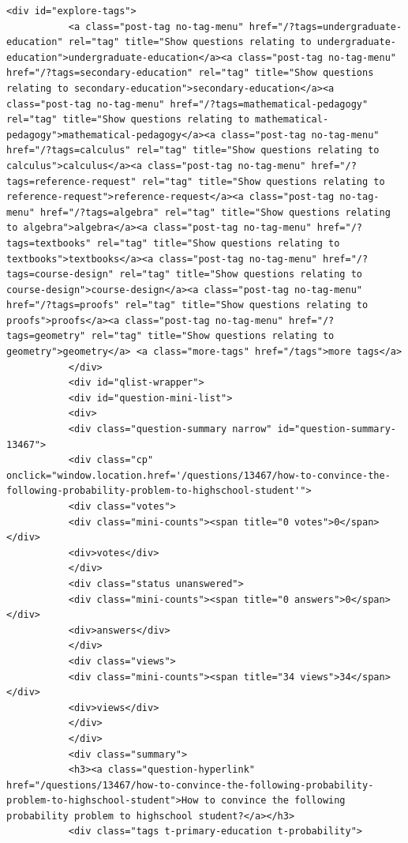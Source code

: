 \documentclass[11pt]{article}
\begin{document}
\begin{Verbatim}[commandchars=\\\{\}]
           <div id="explore-tags">
           <a class="post-tag no-tag-menu" href="/?tags=undergraduate-education" rel="tag" title="Show questions relating to undergraduate-education">undergraduate-education</a><a class="post-tag no-tag-menu" href="/?tags=secondary-education" rel="tag" title="Show questions relating to secondary-education">secondary-education</a><a class="post-tag no-tag-menu" href="/?tags=mathematical-pedagogy" rel="tag" title="Show questions relating to mathematical-pedagogy">mathematical-pedagogy</a><a class="post-tag no-tag-menu" href="/?tags=calculus" rel="tag" title="Show questions relating to calculus">calculus</a><a class="post-tag no-tag-menu" href="/?tags=reference-request" rel="tag" title="Show questions relating to reference-request">reference-request</a><a class="post-tag no-tag-menu" href="/?tags=algebra" rel="tag" title="Show questions relating to algebra">algebra</a><a class="post-tag no-tag-menu" href="/?tags=textbooks" rel="tag" title="Show questions relating to textbooks">textbooks</a><a class="post-tag no-tag-menu" href="/?tags=course-design" rel="tag" title="Show questions relating to course-design">course-design</a><a class="post-tag no-tag-menu" href="/?tags=proofs" rel="tag" title="Show questions relating to proofs">proofs</a><a class="post-tag no-tag-menu" href="/?tags=geometry" rel="tag" title="Show questions relating to geometry">geometry</a> <a class="more-tags" href="/tags">more tags</a>
           </div>
           <div id="qlist-wrapper">
           <div id="question-mini-list">
           <div>
           <div class="question-summary narrow" id="question-summary-13467">
           <div class="cp" onclick="window.location.href='/questions/13467/how-to-convince-the-following-probability-problem-to-highschool-student'">
           <div class="votes">
           <div class="mini-counts"><span title="0 votes">0</span></div>
           <div>votes</div>
           </div>
           <div class="status unanswered">
           <div class="mini-counts"><span title="0 answers">0</span></div>
           <div>answers</div>
           </div>
           <div class="views">
           <div class="mini-counts"><span title="34 views">34</span></div>
           <div>views</div>
           </div>
           </div>
           <div class="summary">
           <h3><a class="question-hyperlink" href="/questions/13467/how-to-convince-the-following-probability-problem-to-highschool-student">How to convince the following probability problem to highschool student?</a></h3>
           <div class="tags t-primary-education t-probability">

\end{Verbatim}
\end{document}
